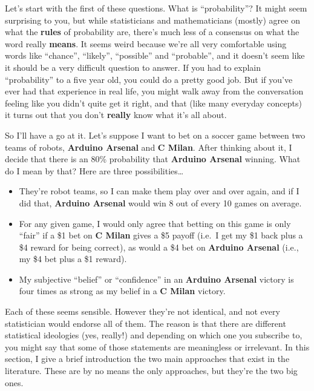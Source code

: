 \documentclass[
  letterpaper,
  DIV=11,
  numbers=noendperiod]{scrreprt}
\begin{document}
Let's start with the first of these questions. What is ``probability''?
It might seem surprising to you, but while statisticians and
mathematicians (mostly) agree on what the \textbf{rules} of probability
are, there's much less of a consensus on what the word really
\textbf{means}. It seems weird because we're all very comfortable using
words like ``chance'', ``likely'', ``possible'' and ``probable'', and it
doesn't seem like it should be a very difficult question to answer. If
you had to explain ``probability'' to a five year old, you could do a
pretty good job. But if you've ever had that experience in real life,
you might walk away from the conversation feeling like you didn't quite
get it right, and that (like many everyday concepts) it turns out that
you don't \textbf{really} know what it's all about.

So I'll have a go at it. Let's suppose I want to bet on a soccer game
between two teams of robots, \textbf{Arduino Arsenal} and \textbf{C
Milan}. After thinking about it, I decide that there is an 80\%
probability that \textbf{Arduino Arsenal} winning. What do I mean by
that? Here are three possibilities\ldots{}

\begin{itemize}
\item
  They're robot teams, so I can make them play over and over again, and
  if I did that, \textbf{Arduino Arsenal} would win 8 out of every 10
  games on average.
\item
  For any given game, I would only agree that betting on this game is
  only ``fair'' if a \$1 bet on \textbf{C Milan} gives a \$5 payoff
  (i.e.~I get my \$1 back plus a \$4 reward for being correct), as would
  a \$4 bet on \textbf{Arduino Arsenal} (i.e., my \$4 bet plus a \$1
  reward).
\item
  My subjective ``belief'' or ``confidence'' in an \textbf{Arduino
  Arsenal} victory is four times as strong as my belief in a \textbf{C
  Milan} victory.
\end{itemize}

Each of these seems sensible. However they're not identical, and not
every statistician would endorse all of them. The reason is that there
are different statistical ideologies (yes, really!) and depending on
which one you subscribe to, you might say that some of those statements
are meaningless or irrelevant. In this section, I give a brief
introduction the two main approaches that exist in the literature. These
are by no means the only approaches, but they're the two big ones.
\end{document}
